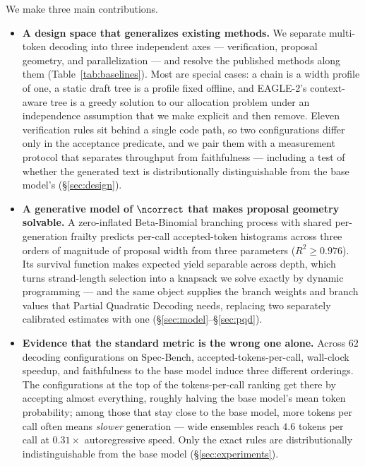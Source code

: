 \documentclass{article} %
\makeatletter
\newenvironment{ai}
  {\color{lightgray}%
   \@ifpackageloaded{caption}{\captionsetup{font={color=lightgray}}}{}%
   \let\ai@savedfloatreset\@floatboxreset
   \g@addto@macro\@floatboxreset{\color{lightgray}}}
  {\global\let\@floatboxreset\ai@savedfloatreset}
\makeatother
\begin{document}
\begin{ai}
We make three main contributions.

\begin{itemize}
  \item \textbf{A design space that generalizes existing methods.} We separate
  multi-token decoding into three independent axes --- verification, proposal
  geometry, and parallelization --- and resolve the published methods along them
  (Table~\ref{tab:baselines}). Most are special cases: a chain is a width profile
  of one, a static draft tree is a profile fixed offline, and EAGLE-2's
  context-aware tree is a greedy solution to our allocation problem under an
  independence assumption that we make explicit and then remove. Eleven
  verification rules sit behind a single code path, so two configurations differ
  only in the acceptance predicate, and we pair them with a measurement protocol
  that separates throughput from faithfulness --- including a test of whether the
  generated text is distributionally distinguishable from the base model's
  (\S\ref{sec:design}).

  \item \textbf{A generative model of $\ncorrect$ that makes proposal geometry
  solvable.} A zero-inflated Beta-Binomial branching process with shared
  per-generation frailty predicts per-call accepted-token histograms across three
  orders of magnitude of proposal width from three parameters
  ($R^2 \geq 0.976$). Its survival function makes expected yield separable across
  depth, which turns strand-length selection into a knapsack we solve exactly by
  dynamic programming --- and the same object supplies the branch weights and
  branch values that Partial Quadratic Decoding needs, replacing two separately
  calibrated estimates with one (\S\ref{sec:model}--\S\ref{sec:pqd}).

  \item \textbf{Evidence that the standard metric is the wrong one alone.}
  Across $62$ decoding configurations on Spec-Bench, accepted-tokens-per-call,
  wall-clock speedup, and faithfulness to the base model induce three different
  orderings. The configurations at the top of the tokens-per-call ranking get
  there by accepting almost everything, roughly halving the base model's mean
  token probability; among those that stay close to the base model, more tokens
  per call often means \emph{slower} generation --- wide ensembles reach $4.6$
  tokens per call at $0.31\times$ autoregressive speed. Only the exact rules are
  distributionally indistinguishable from the base model
  (\S\ref{sec:experiments}).
\end{itemize}


\end{ai}
\end{document}
